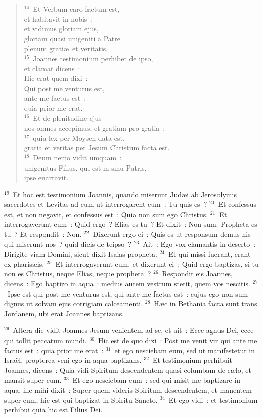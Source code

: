\begin{flushleft}
\begin{verse}
${}^{14}$~Et Verbum caro factum est,\\ et habitavit in nobis~:\\ et vidimus gloriam ejus,\\ gloriam quasi unigeniti a Patre\\ plenum grati\ae\ et veritatis.\\
${}^{15}$~Joannes testimonium perhibet de ipso,\\ et clamat dicens~:\\ Hic erat quem dixi~:\\ Qui post me venturus est,\\ ante me factus est~:\\ quia prior me erat.\\
${}^{16}$~Et de plenitudine ejus\\ nos omnes accepimus, et gratiam pro gratia~:\\
${}^{17}$~quia lex per Moysen data est,\\ gratia et veritas per Jesum Christum facta est.\\
${}^{18}$~Deum nemo vidit umquam~:\\ unigenitus Filius, qui est in sinu Patris,\\ ipse enarravit.\end{verse}\end{flushleft}


${}^{19}$~Et hoc est testimonium Joannis, quando miserunt Jud\ae i ab Jerosolymis sacerdotes et Levitas ad eum ut interrogarent eum~: Tu quis es~?
${}^{20}$~Et confessus est, et non negavit, et confessus est~: Quia non sum ego Christus.
${}^{21}$~Et interrogaverunt eum~: Quid ergo~? Elias es tu~? Et dixit~: Non sum. Propheta es tu~? Et respondit~: Non.
${}^{22}$~Dixerunt ergo ei~: Quis es ut responsum demus his qui miserunt nos~? quid dicis de teipso~?
${}^{23}$~Ait~: Ego vox clamantis in deserto~: Dirigite viam Domini, sicut dixit Isaias propheta.
${}^{24}$~Et qui missi fuerant, erant ex pharis\ae is.
${}^{25}$~Et interrogaverunt eum, et dixerunt ei~: Quid ergo baptizas, si tu non es Christus, neque Elias, neque propheta~?
${}^{26}$~Respondit eis Joannes, dicens~: Ego baptizo in aqua~: medius autem vestrum stetit, quem vos nescitis.
${}^{27}$~Ipse est qui post me venturus est, qui ante me factus est~: cujus ego non sum dignus ut solvam ejus corrigiam calceamenti.
${}^{28}$~H\ae c in Bethania facta sunt trans Jordanem, ubi erat Joannes baptizans.


${}^{29}$~Altera die vidit Joannes Jesum venientem ad se, et ait~: Ecce agnus Dei, ecce qui tollit peccatum mundi.
${}^{30}$~Hic est de quo dixi~: Post me venit vir qui ante me factus est~: quia prior me erat~:
${}^{31}$~et ego nesciebam eum, sed ut manifestetur in Isra\"el, propterea veni ego in aqua baptizans.
${}^{32}$~Et testimonium perhibuit Joannes, dicens~: Quia vidi Spiritum descendentem quasi columbam de c\ae lo, et mansit super eum.
${}^{33}$~Et ego nesciebam eum~: sed qui misit me baptizare in aqua, ille mihi dixit~: Super quem videris Spiritum descendentem, et manentem super eum, hic est qui baptizat in Spiritu Sancto.
${}^{34}$~Et ego vidi~: et testimonium perhibui quia hic est Filius Dei.


